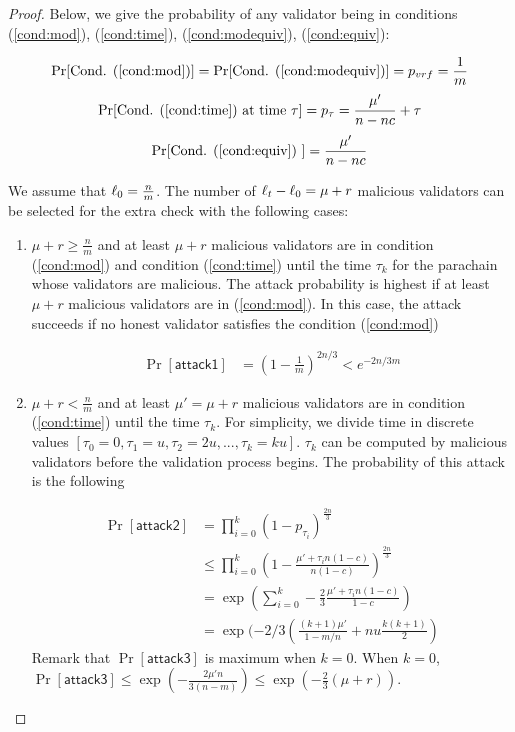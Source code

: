 \begin{proof}

Below, we give the probability of any validator being in conditions (\ref{cond:mod}), (\ref{cond:time}), (\ref{cond:modequiv}), (\ref{cond:equiv}):

$$\Pr[\text{Cond. (\ref{cond:mod})}] = \Pr[\text{Cond. (\ref{cond:modequiv})}] = p_{vrf} = \frac{1}{m}$$
$$\Pr[\text{Cond. (\ref{cond:time}) at time } \tau] = p_\tau =  \frac{\mu'}{n - nc} + \tau $$
$$\Pr[\text{Cond. (\ref{cond:equiv}) }] = \frac{\mu'}{n - nc} $$


We assume that $\ell_0 = \frac{n}{m}$.  The number of $\ell_t-\ell_0 = \mu + r$ malicious validators can be selected for the extra check with the following cases:

\begin{enumerate}
    
    \item $\mu + r \geq \frac{n}{m}$ and at least $\mu + r$ malicious validators are in condition (\ref{cond:mod}) and condition (\ref{cond:time}) until the time $\tau_k$ for the parachain whose validators are malicious. The attack probability is highest if at least $\mu + r$
    malicious validators are in (\ref{cond:mod}). In this case, the attack succeeds if no honest validator satisfies the condition (\ref{cond:mod}) 
    
    
    \begin{align}\label{eq:attack2}
        \Pr[\mathsf{attack1}] &= (1-\frac{1}{m})^{2n/3} <  e^{-2n/3m} \nonumber
    \end{align}
    
    
    \item $\mu+r < \frac{n}{m}$ and at least $\mu' = \mu+r$ malicious validators are in condition (\ref{cond:time}) until the time $\tau_k$. For simplicity, we divide time in discrete values $[\tau_0 = 0, \tau_1 =u, \tau_2 = 2u, ..., \tau_k = ku]$. $\tau_k$ can be computed by malicious validators before the validation process begins. The probability of this attack is the following
    
    \begin{align}
        \Pr[\mathsf{attack2}] &= \prod_{i = 0}^k(1-p_{\tau_i})^{\frac{2n}{3}} \nonumber\\
        &\leq  \prod_{i = 0}^k (1 - \frac{\mu'+\tau_in(1-c)}{n(1-c)})^{\frac{2n}{3}} \nonumber\\
        &=  \exp(\sum_{i = 0}^k -\frac{2}{3}\frac{\mu' + \tau_in(1-c)}{1-c}) \nonumber\\
        & = \exp(-2/3(\frac{(k+1)\mu'}{1-m/n}+ nu\frac{k(k+1)}{2})\nonumber
    \end{align}
    Remark that $\Pr[\mathsf{attack3}]$ is maximum when $k = 0$. When $k = 0$, $\Pr[\mathsf{attack3}] \leq \exp(-\frac{2\mu' n}{3(n-m)}) \leq \exp(-\frac{2}{3}(\mu + r))$.
    

\end{enumerate}
\end{proof}
